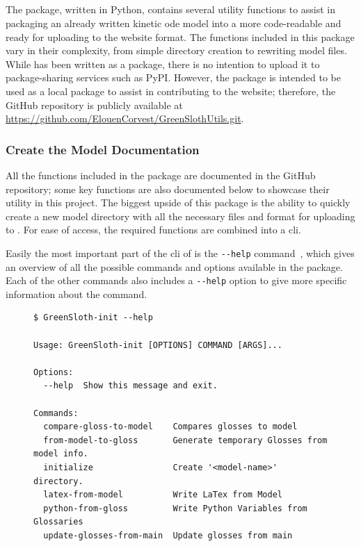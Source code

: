 \subsection{\greensloth[GreenSlothUtils]}\label{sec:greenslothutils}

The \greensloth[GreenSlothUtils] package, written in Python, contains several utility functions to assist in packaging an already written kinetic \gls{ode} model into a more code-readable and ready for uploading to the \greensloth{} website format. The functions included in this package vary in their complexity, from simple directory creation to rewriting model files. While \greensloth[GreenSlothUtils] has been written as a package, there is no intention to upload it to package-sharing services such as PyPI. However, the package is intended to be used as a local package to assist in contributing to the \greensloth{} website; therefore, the GitHub repository is publicly available at \url{https://github.com/ElouenCorvest/GreenSlothUtils.git}.

\subsubsection{Create the Model Documentation}

All the functions included in the package are documented in the GitHub repository; some key functions are also documented below to showcase their utility in this project. The biggest upside of this package is the ability to quickly create a new model directory with all the necessary files and format for uploading to \greensloth{}. For ease of access, the required functions are combined into a \gls{cli}.

Easily the most important part of the \gls{cli} of \greensloth[GreenSlothUtils] is the \verb|--help| command~, which gives an overview of all the possible commands and options available in the package. Each of the other commands also includes a \verb|--help| option to give more specific information about the command.

\begin{figure}
\begin{lstlisting}[style=bashstyle, caption={\textbf{The help command of the CLI of \greensloth[GreenSlothUtils]}}, label={code:greenslothutils-help}]
$ GreenSloth-init --help

Usage: GreenSloth-init [OPTIONS] COMMAND [ARGS]...

Options:
  --help  Show this message and exit.

Commands:
  compare-gloss-to-model    Compares glosses to model
  from-model-to-gloss       Generate temporary Glosses from model info.
  initialize                Create '<model-name>' directory.
  latex-from-model          Write LaTex from Model
  python-from-gloss         Write Python Variables from Glossaries
  update-glosses-from-main  Update glosses from main
\end{lstlisting}
\end{figure}


